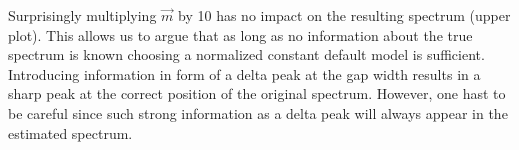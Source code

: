 \FloatBarrier
Surprisingly multiplying $\vec m$ by 10 has no impact on the resulting spectrum (upper plot). This allows us to argue that as long as no information about the true spectrum is known choosing a normalized constant default model is sufficient.
Introducing information in form of a delta peak at the gap width results in a sharp peak at the correct position of the original spectrum. However, one hast to be careful since such strong information as a delta peak will always appear in the estimated spectrum.
